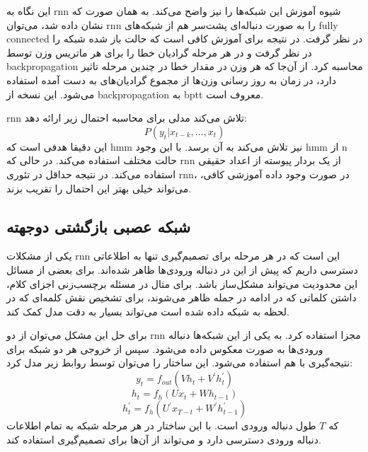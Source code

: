 این نگاه به \gls{rnn} شیوه آموزش این شبکه‌ها را نیز واضح می‌کند. به همان صورت که
نشان داده شد، می‌توان \gls{rnn} را به صورت دنباله‌ای پشت‌سر هم از شبکه‌های
\gls{fully connected} در نظر گرفت. در نتیجه برای آموزش کافی است که حالت باز شده
شبکه را در نظر گرفت و در هر مرحله گرادیان خطا را برای هر ماتریس وزن توسط
\gls{backpropagation} محاسبه کرد. از آن‌جا که هر وزن در مقدار خطا در چندین مرحله
تاثیر دارد، در زمان به روز رسانی وزن‌ها از مجموع گرادیان‌های به دست آمده استفاده
می‌شود. این نسخه از \gls{backpropagation} به \gls{bptt} معروف است.

\gls{rnn} تلاش می‌کند مدلی برای محاسبه احتمال زیر ارائه دهد:
\begin{equation}
    P(y_t | x_{t-k}, ..., x_t)
\end{equation}
این دقیقا هدفی است که \gls{hmm} نیز تلاش می‌کند به آن برسد. با این وجود
\gls{hmm} از n حالت مختلف استفاده می‌کند. در حالی که \gls{rnn} از یک بردار
پیوسته از اعداد حقیقی استفاده می‌کند. در نتیجه حداقل در تئوری \gls{rnn}، در صورت
وجود داده آموزشی کافی، می‌تواند خیلی بهتر این احتمال را تقریب بزند.

\subsection{شبکه عصبی بازگشتی دوجهته}
یکی از مشکلات \gls{rnn} این است که در هر مرحله برای تصمیم‌گیری تنها به اطلاعاتی
دسترسی داریم که پیش از این در دنباله ورودی‌ها ظاهر شده‌اند. برای بعضی از مسائل
این محدودیت می‌تواند مشکل‌ساز باشد. برای مثال در مسئله برچسب‌زنی اجزای کلام،
داشتن کلماتی که در ادامه در جمله ظاهر می‌شوند، برای تشخیص نقش کلمه‌ای که در لحظه
به شبکه داده شده است می‌تواند بسیار به دقت مدل کمک کند.

برای حل این مشکل می‌توان از دو \gls{rnn} مجزا استفاده کرد. به یکی از این شبکه‌ها
دنباله ورودی‌ها به صورت معکوس داده می‌شود. سپس از خروجی هر دو شبکه برای
نتیجه‌گیری با هم استفاده می‌شود. این ساختار را می‌توان توسط روابط زیر مدل کرد:
\begin{equation}
    y_t = f_{out}(Vh_t + V^\prime h_t^\prime)
\end{equation}
\begin{equation}
    h_t = f_h(Ux_t + Wh_{t-1})
\end{equation}
\begin{equation}
    h_t^\prime = f_h(U^\prime x_{T - t} + W^\prime h_{t-1}^\prime)
\end{equation}
که $T$ طول دنباله ورودی است. با این ساختار در هر مرحله شبکه به تمام اطلاعات
دنباله ورودی دسترسی دارد و می‌تواند از آن‌ها برای تصمیم‌گیری استفاده کند.

